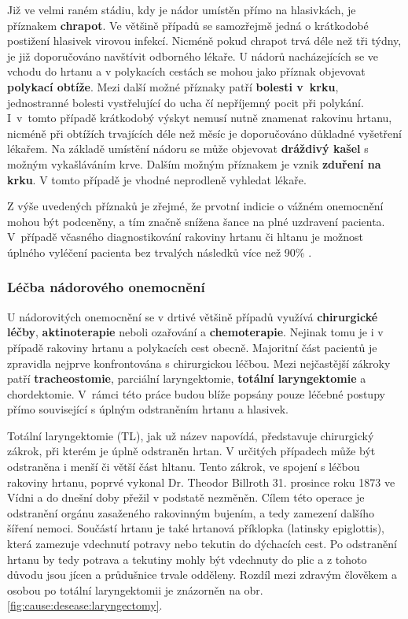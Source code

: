 Již ve velmi raném stádiu, kdy je nádor umístěn přímo na hlasivkách, je
příznakem \textbf{chrapot}. Ve většině případů se samozřejmě jedná o
krátkodobé postižení hlasivek virovou infekcí. Nicméně pokud chrapot trvá déle
než tři týdny, je již doporučováno navštívit odborného lékaře.
U nádorů nacházejících se ve vchodu do hrtanu a v polykacích cestách se mohou
jako příznak objevovat \textbf{polykací obtíže}. Mezi další možné příznaky
patří \textbf{bolesti v~krku}, jednostranné bolesti vystřelující do ucha čí
nepříjemný pocit při polykání. I~v~tomto případě krátkodobý výskyt nemusí
nutně znamenat rakovinu hrtanu, nicméně při obtížích trvajících déle než měsíc
je doporučováno důkladné  vyšetření lékařem.
Na základě umístění nádoru se může objevovat \textbf{dráždivý kašel} s možným
vykašláváním krve. Dalším možným příznakem je vznik \textbf{zduření na krku}.
V tomto případě je vhodné neprodleně vyhledat lékaře.

Z výše uvedených příznaků je zřejmé, že prvotní indicie o vážném onemocnění
mohou být podceněny, a tím značně snížena šance na plné uzdravení pacienta.
V~případě včasného diagnostikování rakoviny hrtanu či hltanu je možnost
úplného vyléčení pacienta bez trvalých následků více než 90\%
\cite{Slavicek2000}.


\subsubsection{Léčba nádorového onemocnění} %
\label{chap:cause:desease:cancer:treatment}

U nádorovitých onemocnění se v drtivé většině případů využívá
\textbf{chirurgické léčby}, \textbf{aktinoterapie} neboli ozařování a
\textbf{chemoterapie}. Nejinak tomu je i v případě rakoviny hrtanu a
polykacích cest obecně. Majoritní část pacientů je zpravidla nejprve
konfrontována s chirurgickou léčbou. Mezi nejčastější zákroky patří
\textbf{tracheostomie}, parciální laryngektomie, \textbf{totální
laryngektomie} a chordektomie. V~rámci této práce budou blíže popsány pouze
léčebné postupy přímo související s úplným odstraněním hrtanu a hlasivek.

Totální laryngektomie (TL), jak už název napovídá, představuje chirurgický
zákrok, při kterém je úplně odstraněn hrtan. V určitých případech může být
odstraněna i menší či větší část hltanu. Tento zákrok, ve spojení s léčbou
rakoviny hrtanu, poprvé vykonal Dr. Theodor Billroth 31. prosince roku 1873 ve
Vídni \cite{Gussenbauer1874} a do dnešní doby přežil v podstatě nezměněn.
Cílem této operace je odstranění orgánu zasaženého rakovinným bujením, a tedy
zamezení dalšího šíření nemoci. Součástí hrtanu je také hrtanová příklopka
(latinsky epiglottis), která zamezuje vdechnutí potravy nebo tekutin do
dýchacích cest. Po odstranění hrtanu by tedy potrava a tekutiny mohly být
vdechnuty do plic a z tohoto důvodu jsou jícen a průdušnice trvale odděleny.
Rozdíl mezi zdravým člověkem a osobou po totální laryngektomii je znázorněn na
obr. \ref{fig:cause:desease:laryngectomy}.

